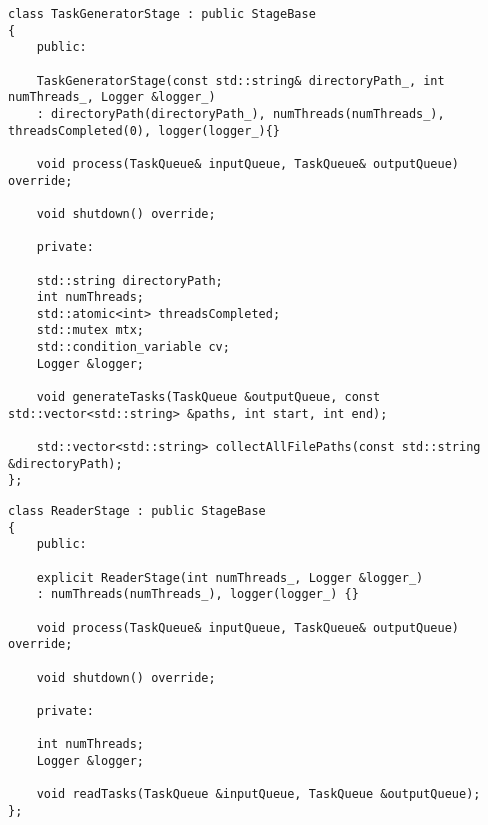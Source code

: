\begin{center}
	\captionsetup{justification=raggedright,singlelinecheck=off}
	\begin{lstlisting}[caption={Интерфейс класса TaskGeneratorStage}, label={lst:TaskGeneratorStage}]
class TaskGeneratorStage : public StageBase
{
	public:
	
	TaskGeneratorStage(const std::string& directoryPath_, int numThreads_, Logger &logger_)
	: directoryPath(directoryPath_), numThreads(numThreads_), threadsCompleted(0), logger(logger_){}
	
	void process(TaskQueue& inputQueue, TaskQueue& outputQueue) override;
	
	void shutdown() override;
	
	private:
	
	std::string directoryPath;
	int numThreads;
	std::atomic<int> threadsCompleted;
	std::mutex mtx;
	std::condition_variable cv;
	Logger &logger;
	
	void generateTasks(TaskQueue &outputQueue, const std::vector<std::string> &paths, int start, int end);
	
	std::vector<std::string> collectAllFilePaths(const std::string &directoryPath);
};
	\end{lstlisting}
\end{center}

\begin{center}
	\captionsetup{justification=raggedright,singlelinecheck=off}
	\begin{lstlisting}[caption={Интерфейс класса ReaderStage}, label={lst:ReaderStage}]
class ReaderStage : public StageBase
{
	public:
	
	explicit ReaderStage(int numThreads_, Logger &logger_)
	: numThreads(numThreads_), logger(logger_) {}
	
	void process(TaskQueue& inputQueue, TaskQueue& outputQueue) override;
	
	void shutdown() override;
	
	private:
	
	int numThreads;
	Logger &logger;
	
	void readTasks(TaskQueue &inputQueue, TaskQueue &outputQueue);
};
	\end{lstlisting}
\end{center}

